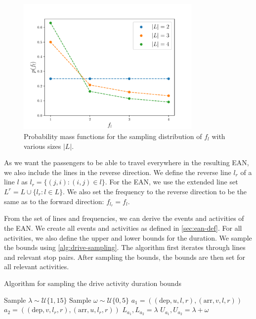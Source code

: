 \documentclass[english, 12pt, a4paper, sci, utf8, a-2b, online]{aaltothesis}
\newcommand{\unif}[1]{\mathcal{U}\{#1\}}
\begin{document}
\begin{figure}[h]
    \centering
    \includegraphics[width=0.8\textwidth]{figures/generation-rl-sample-density.pdf}
    \caption{Probability mass functions for the sampling distribution of $f_l$ with various sizes $|L|$.}
    \label{fig:generation-rl-mass}
\end{figure}


As we want the passengers to be able to travel everywhere in the resulting EAN, we also include the lines in the reverse direction. We define the reverse line $l_r$ of a line $l$ as $l_r = \{(j, i):(i, j) \in l\}$. For the EAN, we use the extended line set $L^r = L \cup \{l_r : l \in L \}$. We also set the frequency to the reverse direction to be the same as to the forward direction: $f_{l_r} = f_l$.

From the set of lines and frequencies, we can derive the events and activities of the EAN. We create all events and activities as defined in \cref{sec:ean-def}. For all activities, we also define the upper and lower bounds for the duration. We sample the bounds using \cref{alg:drive-sampling}. The algorithm first iterates through lines and relevant stop pairs. After sampling the bounds, the bounds are then set for all relevant activities.


\begin{algorithm}

\caption{Algorithm for sampling the drive activity duration bounds}
\label{alg:drive-sampling}
\begin{algorithmic}
            \State Sample $\lambda \sim \unif{1, 15}$ 
            \State Sample $\omega \sim \unif{0, 5}$ 
                \State $a_1 = ((\text{dep}, u, l, r), (\text{arr}, v, l, r))$ 
                \State $a_2 = ((\text{dep}, v, l_r, r), (\text{arr}, u, l_r, r))$ 
                \State $L_{a_1}, L_{a_2} = \lambda$
                \State $U_{a_1}, U_{a_2} = \lambda + \omega$
            \EndFor
        \EndFor
    \EndFor
\end{algorithmic}

\end{algorithm}
\end{document}
